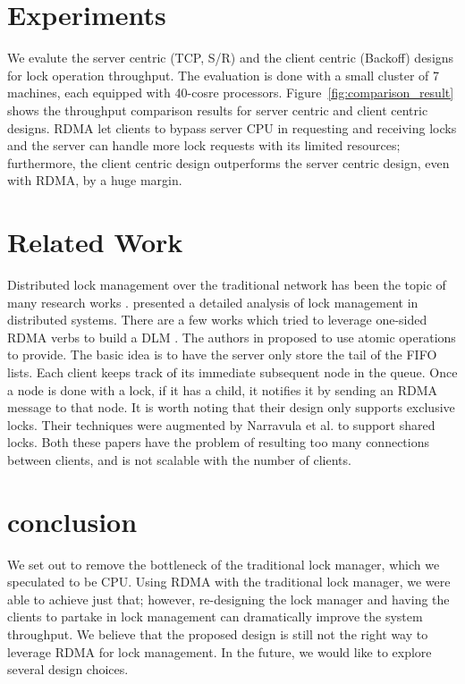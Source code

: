 \documentclass[twoside]{article}
\begin{document}
\begin{multicols}{2}
\section{Experiments}
\label{experiments}
We evalute the server centric (TCP, S/R) and the client centric (Backoff) designs for lock operation throughput. The evaluation is done with a small cluster of 7 machines, each equipped with 40-cosre processors.   Figure~\ref{fig:comparison_result} shows the throughput comparison results for server centric and client centric designs. RDMA let clients to bypass server CPU in requesting and receiving locks and the server can handle more lock requests with its limited resources; furthermore, the client centric design outperforms the server centric design, even with RDMA, by a huge margin. 





\section{Related Work}
\label{related-works}
Distributed lock management over the traditional network has been the topic of many research works \cite{Aldred:distributed:95, kishida:SSDLM:03}.
\cite{born:analytical:96, knottenbelt:performance:01} presented a detailed analysis of lock management in distributed systems. 
There are a few works which tried to leverage one-sided RDMA verbs to build a DLM \cite{devulapalli:distributed-queue-based-locking:05, narravula:high-performance-distributed-lock-management:07}.
The authors in \cite{devulapalli:distributed-queue-based-locking:05} proposed to use atomic operations to provide.
The basic idea is to have the server only store the tail of the FIFO lists.
Each client keeps track of its immediate subsequent node in the queue.
Once a node is done with a lock, if it has a child, it notifies it by sending an RDMA message to that node.
It is worth noting that their design only supports exclusive locks.
Their techniques were augmented by Narravula et al. \cite{narravula:high-performance-distributed-lock-management:07} to support shared locks. 
Both these papers have the problem of resulting too many connections between clients, and is not scalable with the number of clients.   




\section{conclusion}
We set out to remove the bottleneck of the traditional lock manager, which we speculated to be CPU. Using RDMA with the traditional lock manager, we were able to achieve just that; however, re-designing the lock manager and having the clients to partake in lock management can dramatically improve the system throughput. We believe that the proposed design is still not the right way to leverage RDMA for lock management. In the future, we would like to explore several design choices.















\end{multicols}
\end{document}
